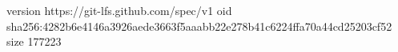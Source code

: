 version https://git-lfs.github.com/spec/v1
oid sha256:4282b6e4146a3926aede3663f5aaabb22e278b41c6224ffa70a44cd25203cf52
size 177223
